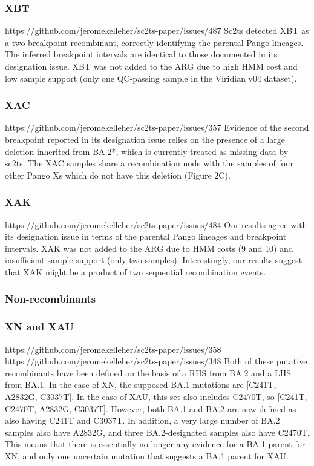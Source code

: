 \documentclass[12pt,letterpaper]{article}
\begin{document}
\subsubsection*{XBT}
https://github.com/jeromekelleher/sc2ts-paper/issues/487
Sc2ts detected XBT as a two-breakpoint recombinant,
correctly identifying the parental Pango lineages.
The inferred breakpoint intervals are identical to those documented in its designation issue.
XBT was not added to the ARG due to high HMM cost and low sample support
(only one QC-passing sample in the Viridian v04 dataset).

\subsubsection*{XAC}
https://github.com/jeromekelleher/sc2ts-paper/issues/357
Evidence of the second breakpoint reported in its designation issue relies on
the presence of a large deletion inherited from BA.2*, which is currently treated as missing data by sc2ts.
The XAC samples share a recombination node with the samples of four other Pango Xs
which do not have this deletion (Figure 2C).

\subsubsection*{XAK}
https://github.com/jeromekelleher/sc2ts-paper/issues/484
Our results agree with its designation issue in terms of the parental Pango lineages and breakpoint intervals.
XAK was not added to the ARG due to HMM costs (9 and 10) and insufficient sample support (only two samples).
Interestingly, our results suggest that XAK might be a product of two sequential recombination events.

\subsubsection*{Non-recombinants}
\subsubsection*{XN and XAU}
https://github.com/jeromekelleher/sc2ts-paper/issues/358
https://github.com/jeromekelleher/sc2ts-paper/issues/348
Both of these putative recombinants have been defined on the basis of a RHS from BA.2 and a LHS from BA.1.
In the case of XN, the supposed BA.1 mutations are [C241T, A2832G, C3037T].
In the case of XAU, this set also includes C2470T, so [C241T, C2470T, A2832G, C3037T].
However, both BA.1 and BA.2 are now defined as also having C241T and C3037T.
In addition, a very large number of BA.2 samples also have A2832G, and three BA.2-designated samples also have C2470T.
This means that there is essentially no longer any evidence for a BA.1 parent for XN, and
only one uncertain mutation that suggests a BA.1 parent for XAU.
\end{document}
